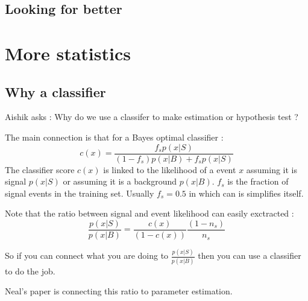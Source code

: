 


\subsection{Looking for better} %
\label{sub:looking_for_better}






\section{More statistics} %
\label{sec:more_statistics}



\subsection{Why a classifier} %
\label{sub:why_a_classifier}

Aishik asks : Why do we use a classifer to make estimation or hypothesis test ?

The main connection is that for a Bayes optimal classifier \needcite : 
\begin{equation}
	c(x) = \frac{f_s p(x|S)}{(1-f_s) p(x|B) + f_s p(x|S)}
\end{equation}
The classifier score $c(x)$ is linked to the likelihood of a event $x$ assuming it is signal $ p(x|S)$ or assuming it is a background $p(x|B)$.
$f_s$ is the fraction of signal events in the training set.
Usually $f_s = 0.5$ in which can is simplifies itself.

Note that the ratio between signal and event likelihood can easily exctracted :
\begin{equation}
	\frac{p(x|S)}{p(x|B)} = \frac{c(x)}{(1-c(x))} \frac{(1-n_s)}{n_s} 
\end{equation}

So if you can connect what you are doing to $\frac{p(x|S)}{p(x|B)}$ then you can use a classifier to do the job.

Neal's paper \cite{Neal:2007zz} is connecting this ratio to parameter estimation.

